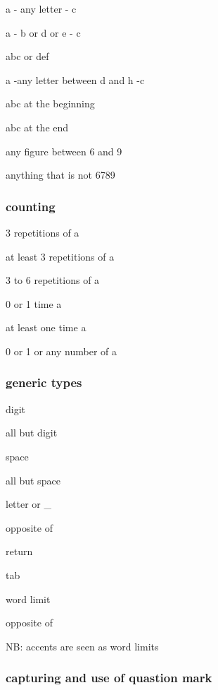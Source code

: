			 a - any  letter  - c

			 a - b or d or e - c

			 abc or def

			 a -any letter between d and h -c

			 abc at the beginning

			 abc at the end

			\code{[6-9]} any figure between 6 and 9

			\code{[\^{}6-9]} anything that is not 6789

			
		\subsubsection{counting}

			 3 repetitions of a

			  at least 3 repetitions of a

			 3 to 6 repetitions of a

			 0 or 1 time a

			 at least one time a

			 0 or 1 or any number of a



		\subsubsection{generic types}
			
			 digit

			 all but digit

			 space

			 all but space

			 letter or \_{}

			 opposite of  

			 return

			 tab

			 word limit

			 opposite of  

			NB: accents are seen as word limits


		\subsubsection{capturing and use of quastion mark}



